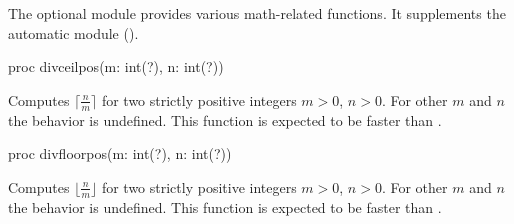 The optional module  provides various math-related functions.
It supplements the automatic  module ().

\begin{protohead}
proc divceilpos(m: int(?), n: int(?))
\end{protohead}
\begin{protobody}
Computes
$\lceil\frac{n}{m}\rceil$
for two strictly positive integers $m>0$, $n>0$.
For other $m$ and $n$ the behavior is undefined.
This function is expected to be faster than .
\end{protobody}

\begin{protohead}
proc divfloorpos(m: int(?), n: int(?))
\end{protohead}
\begin{protobody}
Computes
$\lfloor\frac{n}{m}\rfloor$
for two strictly positive integers $m>0$, $n>0$.
For other $m$ and $n$ the behavior is undefined.
This function is expected to be faster than .
\end{protobody}

